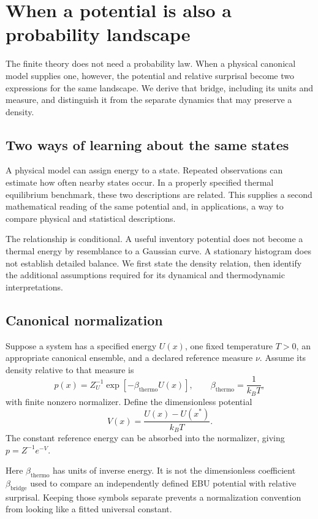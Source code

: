 \chapter{When a potential is also a probability landscape}\label{ch:equilibrium-bridge}

The finite theory does not need a probability law. When a physical canonical model supplies one, however, the potential and relative surprisal become two expressions for the same landscape. We derive that bridge, including its units and measure, and distinguish it from the separate dynamics that may preserve a density.


\section{Two ways of learning about the same states}
A physical model can assign energy to a state. Repeated observations can estimate how often nearby states occur. In a properly specified thermal equilibrium benchmark, these two descriptions are related. This supplies a second mathematical reading of the same potential and, in applications, a way to compare physical and statistical descriptions.

The relationship is conditional. A useful inventory potential does not become a thermal energy by resemblance to a Gaussian curve. A stationary histogram does not establish detailed balance. We first state the density relation, then identify the additional assumptions required for its dynamical and thermodynamic interpretations.

\section{Canonical normalization}
Suppose a system has a specified energy $U(x)$, one fixed temperature $T>0$, an appropriate canonical ensemble, and a declared reference measure $\nu$. Assume its density relative to that measure is
\begin{equation}
 p(x)=Z_U^{-1}\exp[-\beta_{\mathrm{thermo}}U(x)],
 \qquad \beta_{\mathrm{thermo}}=\frac1{k_BT},
\end{equation}
with finite nonzero normalizer. Define the dimensionless potential
\begin{equation}\label{eq:thermal-potential}
 V(x)=\frac{U(x)-U(x^*)}{k_BT}.
\end{equation}
The constant reference energy can be absorbed into the normalizer, giving $p=Z^{-1}e^{-V}$.

Here $\beta_{\mathrm{thermo}}$ has units of inverse energy. It is not the dimensionless coefficient $\beta_{\mathrm{bridge}}$ used to compare an independently defined EBU potential with relative surprisal. Keeping those symbols separate prevents a normalization convention from looking like a fitted universal constant.

